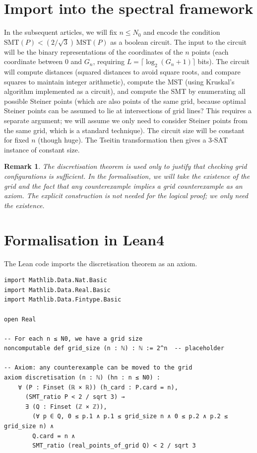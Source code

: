\documentclass[11pt,a4paper]{article}
\newtheorem{remark}[theorem]{Remark}
\begin{document}
\section{Import into the spectral framework}
In the subsequent articles, we will fix \(n \le N_0\) and encode the condition \(\text{SMT}(P) < (2/\sqrt{3})\,\text{MST}(P)\) as a boolean circuit. The input to the circuit will be the binary representations of the coordinates of the \(n\) points (each coordinate between \(0\) and \(G_n\), requiring \(L = \lceil \log_2(G_n+1)\rceil\) bits). The circuit will compute distances (squared distances to avoid square roots, and compare squares to maintain integer arithmetic), compute the MST (using Kruskal's algorithm implemented as a circuit), and compute the SMT by enumerating all possible Steiner points (which are also points of the same grid, because optimal Steiner points can be assumed to lie at intersections of grid lines? This requires a separate argument; we will assume we only need to consider Steiner points from the same grid, which is a standard technique). The circuit size will be constant for fixed \(n\) (though huge). The Tseitin transformation then gives a 3‑SAT instance of constant size.

\begin{remark}
The discretisation theorem is used only to justify that checking grid configurations is sufficient. In the formalisation, we will take the existence of the grid and the fact that any counterexample implies a grid counterexample as an axiom. The explicit construction is not needed for the logical proof; we only need the existence.
\end{remark}

\section{Formalisation in Lean4}
The Lean code imports the discretisation theorem as an axiom.

\begin{lstlisting}[style=lean, caption={SeriesXXVII/Discretisation.lean (final)}]
import Mathlib.Data.Nat.Basic
import Mathlib.Data.Real.Basic
import Mathlib.Data.Fintype.Basic

open Real

-- For each n ≤ N0, we have a grid size
noncomputable def grid_size (n : ℕ) : ℕ := 2^n  -- placeholder

-- Axiom: any counterexample can be moved to the grid
axiom discretisation (n : ℕ) (hn : n ≤ N0) :
    ∀ (P : Finset (ℝ × ℝ)) (h_card : P.card = n),
      (SMT_ratio P < 2 / sqrt 3) →
      ∃ (Q : Finset (ℤ × ℤ)),
        (∀ p ∈ Q, 0 ≤ p.1 ∧ p.1 ≤ grid_size n ∧ 0 ≤ p.2 ∧ p.2 ≤ grid_size n) ∧
        Q.card = n ∧
        SMT_ratio (real_points_of_grid Q) < 2 / sqrt 3
\end{lstlisting}
\end{document}
